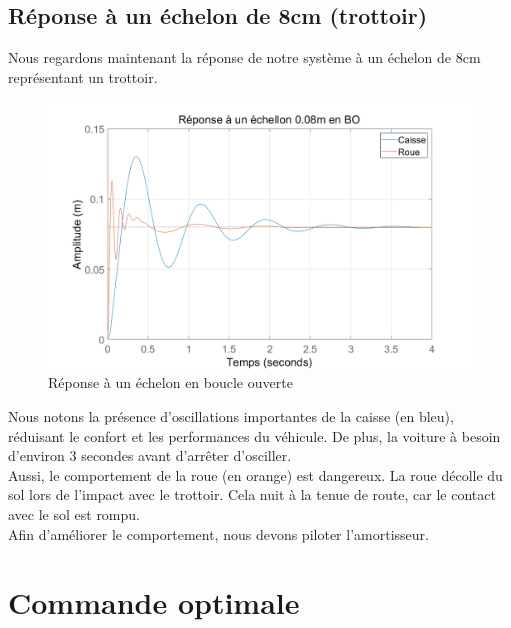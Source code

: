 \documentclass[a4paper,12pt]{insa} %
\begin{document}
\subsection{Réponse à un échelon de 8cm (trottoir)}
Nous regardons maintenant la réponse de notre système à un échelon de 8cm représentant un trottoir.
\begin{center}
    \begin{figure}[H]
        \centering
        \includegraphics[width=13cm, keepaspectratio]{figures/step_bo.png}
        \caption{Réponse à un échelon en boucle ouverte}
        \label{Réponse à un échelon en boucle ouverte}
    \end{figure}
\end{center}
Nous notons la présence d'oscillations importantes de la caisse (en bleu), réduisant le confort et les performances du véhicule. De plus, la voiture à besoin d'environ 3 secondes avant d'arrêter d'osciller.\\
 Aussi, le comportement de la roue (en orange) est dangereux. La roue décolle du sol lors de l'impact avec le trottoir. Cela nuit à la tenue de route, car le contact avec le sol est rompu.\\
 Afin d'améliorer le comportement, nous devons piloter l'amortisseur.
 \newpage
 \section{Commande optimale}
\end{document}
